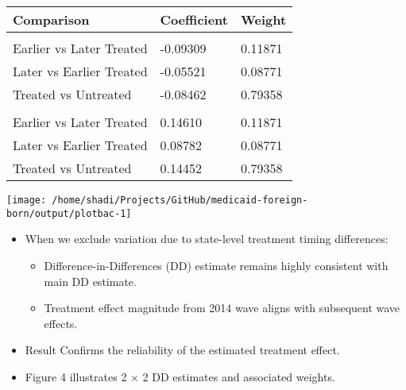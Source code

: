 \documentclass[
]{article}
\providecommand{\tightlist}{%
  \setlength{\itemsep}{0pt}\setlength{\parskip}{0pt}}
\let\origtable\table
\let\endorigtable\endtable
\renewenvironment{table}[1][ht]{
      \expandafter\origtable\expandafter[H]
    }{
      \endorigtable
    }
\begin{document}
\begin{table}

\caption{\label{tab:tab9}Bacon Decomposition}
\centering
\begin{tabular}[t]{lll}
\toprule
Comparison & Coefficient & Weight\\
\midrule
\addlinespace[1em]
\multicolumn{3}{l}{\textbf{Uninsured}}\\
\hspace{1em}Earlier vs Later Treated & -0.09309 & 0.11871\\
\hspace{1em}Later vs Earlier Treated & -0.05521 & 0.08771\\
\hspace{1em}Treated vs Untreated & -0.08462 & 0.79358\\
\addlinespace[0.3em]
\multicolumn{3}{l}{\textbf{Medicaid}}\\
\hspace{1em}Earlier vs Later Treated & 0.14610 & 0.11871\\
\hspace{1em}Later vs Earlier Treated & 0.08782 & 0.08771\\
\hspace{1em}Treated vs Untreated & 0.14452 & 0.79358\\
\bottomrule
\end{tabular}
\end{table}

\begin{center}\texttt{[image: /home/shadi/Projects/GitHub/medicaid-foreign-born/output/plotbac-1]} \end{center}

\begin{itemize}
\item
  When we exclude variation due to state-level treatment timing
  differences:

  \begin{itemize}
  \tightlist
  \item
    Difference-in-Differences (DD) estimate remains highly consistent
    with main DD estimate.
  \item
    Treatment effect magnitude from 2014 wave aligns with subsequent
    wave effects.
  \end{itemize}
\item
  Result Confirms the reliability of the estimated treatment effect.
\item
  Figure 4 illustrates 2 × 2 DD estimates and associated weights.
\end{itemize}
\end{document}
